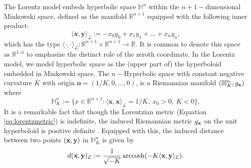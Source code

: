 The Lorentz model embeds hyperbolic space $\mathbb{H}^n$ within the $n+1-$dimensional Minkowski space, defined as the manifold $\mathbb{R}^{n+1}$ equipped with the following inner product:
\begin{equation}\label{eq:lorentzmetric}
    \langle \textbf{x}, \textbf{y} \rangle_{\mathcal{L}} := -x_0y_0 + x_1y_1 + \dots + x_ny_n,
\end{equation}
which has the type 
$\langle \cdot, \cdot \rangle_{\mathcal{L}}: \mathbb{R}^{n+1} \times \mathbb{R}^{n+1} \to \mathbb{R}$.
It is common to denote this space as $\mathbb{R}^{1,n}$ to emphasize the distinct role of the zeroth coordinate.
In the Lorentz model, we model hyperbolic space as the (upper part of) the hyperboloid embedded in Minkowski space.  The $n-$Hyperbolic space with constant negative curvature $K$ with origin $\textbf{o} = (1/K, 0, \dots, 0)$, is a Riemannian manifold $(\mathbb{H}^{n}_K,g_{\mathbf{x}})$ where
\begin{equation*}
    \mathbb{H}^{n}_K := \{x \in \mathbb{R}^{n+1}:  \langle \textbf{x}, \textbf{x} \rangle_{\mathcal{L}} = 1/K, \ x_0 > 0, \ K<0 \},
\end{equation*}
It is a remarkable fact that though the Lorentzian metric (Equation \ref{eq:lorentzmetric}) is indefinite,
the induced Riemannian metric $g_{\mathbf{x}}$ on the unit hyperboloid is positive definite \cite{Ratcliffe94}.
Equipped with this, the induced distance between two points $(\mathbf{x},\mathbf{y})$ in $\mathbb{H}^{n}_K$ is given by
\begin{equation}
    d(\textbf{x},\textbf{y})_{\mathcal{L}} := \frac{1}{\sqrt{-K}}\operatorname{arccosh}(-K \langle \textbf{x}, \textbf{y} \rangle_{\mathcal{L}}).
\end{equation}


